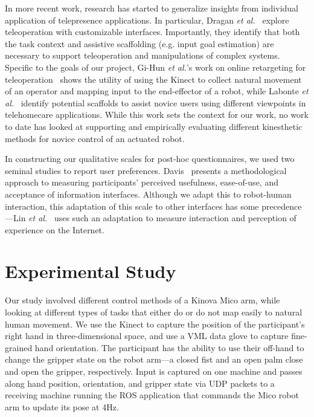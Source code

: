 \documentclass{sigchi}
\begin{document}
In more recent work, research has started to generalize insights from individual application of telepresence applications.  In particular, Dragan \emph{et al.}~\cite{dragan2013teleoperation} explore teleoperation with customizable interfaces.  Importantly, they identify that both the task context and assistive scaffolding (e.g. input goal estimation) are necessary to support teleoperation and manipulations of complex systems. Specific to the goals of our project, Gi-Hun \emph{et al.}'s work on online retargeting for teleoperation~\cite{yang2013online} shows the utility of using the Kinect to collect natural movement of an operator and mapping input to the end-effector of a robot, while Labonte \emph{et al.}~\cite{labonte2010comparative} identify potential scaffolds to assist novice users using different viewpoints in telehomecare applications.  While this work sets the context for our work, no work to date has looked at supporting and empirically evaluating different kinesthetic methods for novice control of an actuated robot.

In constructing our qualitative scales for post-hoc questionnaires, we used two seminal studies to report user preferences.  Davis~\cite{Davis1989} presents a methodological approach to measuring participants' perceived usefulness, ease-of-use, and acceptance of information interfaces. Although we adapt this to robot-human interaction, this adaptation of this scale to other interfaces has some precedence---Lin \emph{et al.}~\cite{Lin2008} uses such an adaptation to measure interaction and perception of experience on the Internet.  

\section{Experimental Study}

Our study involved different control methods of a Kinova Mico arm, while looking at different types of tasks that either do or do not map easily to natural human movement.  
We use the Kinect to capture the position of the participant's right hand in three-dimensional space, and use a VML data glove to capture fine-grained hand orientation.  The participant has the ability to use their off-hand to change the gripper state on the robot arm---a closed fist and an open palm close and open the gripper, respectively.  Input is captured on one machine and passes along hand position, orientation, and gripper state via UDP packets to a receiving machine running the ROS application that commands the Mico robot arm to update its pose at 4Hz. 
\end{document}
